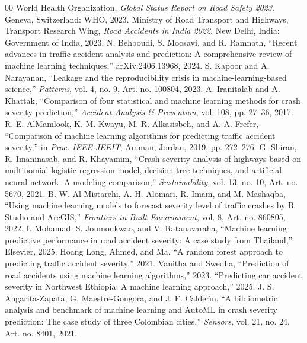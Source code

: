 \documentclass[conference]{IEEEtran}
\begin{document}
\begin{thebibliography}{00}
 World Health Organization, \emph{Global Status Report on Road Safety 2023}. Geneva, Switzerland: WHO, 2023.
 Ministry of Road Transport and Highways, Transport Research Wing, \emph{Road Accidents in India 2022}. New Delhi, India: Government of India, 2023.
 N. Behboudi, S. Moosavi, and R. Ramnath, ``Recent advances in traffic accident analysis and prediction: A comprehensive review of machine learning techniques,'' arXiv:2406.13968, 2024.
 S. Kapoor and A. Narayanan, ``Leakage and the reproducibility crisis in machine-learning-based science,'' \emph{Patterns}, vol. 4, no. 9, Art. no. 100804, 2023.
 A. Iranitalab and A. Khattak, ``Comparison of four statistical and machine learning methods for crash severity prediction,'' \emph{Accident Analysis \& Prevention}, vol. 108, pp. 27--36, 2017.
 R. E. AlMamlook, K. M. Kwayu, M. R. Alkasisbeh, and A. A. Frefer, ``Comparison of machine learning algorithms for predicting traffic accident severity,'' in \emph{Proc. IEEE JEEIT}, Amman, Jordan, 2019, pp. 272--276.
 G. Shiran, R. Imaninasab, and R. Khayamim, ``Crash severity analysis of highways based on multinomial logistic regression model, decision tree techniques, and artificial neural network: A modeling comparison,'' \emph{Sustainability}, vol. 13, no. 10, Art. no. 5670, 2021.
 B. W. Al-Mistarehi, A. H. Alomari, R. Imam, and M. Mashaqba, ``Using machine learning models to forecast severity level of traffic crashes by R Studio and ArcGIS,'' \emph{Frontiers in Built Environment}, vol. 8, Art. no. 860805, 2022.
 I. Mohamad, S. Jomnonkwao, and V. Ratanavaraha, ``Machine learning predictive performance in road accident severity: A case study from Thailand,'' Elsevier, 2025.
 Hoang Long, Ahmed, and Ma, ``A random forest approach to predicting traffic accident severity,'' 2021.
 Vanitha and Swedha, ``Prediction of road accidents using machine learning algorithms,'' 2023.
 ``Predicting car accident severity in Northwest Ethiopia: A machine learning approach,'' 2025.
 J. S. Angarita-Zapata, G. Maestre-Gongora, and J. F. Calder\'{\i}n, ``A bibliometric analysis and benchmark of machine learning and AutoML in crash severity prediction: The case study of three Colombian cities,'' \emph{Sensors}, vol. 21, no. 24, Art. no. 8401, 2021.

\end{thebibliography}
\end{document}
